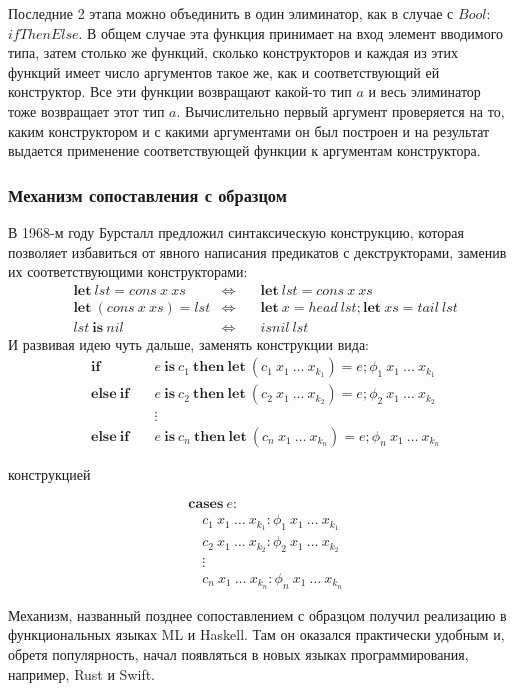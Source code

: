 Последние 2 этапа можно объединить в один элиминатор, как в случае с \(Bool\):
\(ifThenElse\). В общем случае эта функция принимает на вход элемент вводимого
типа, затем столько же функций, сколько конструкторов и каждая из этих функций
имеет число аргументов такое же, как и соответствующий ей конструктор. Все эти
функции возвращают какой-то тип \(a\) и весь элиминатор тоже возвращает этот тип \(a\).
Вычислительно первый аргумент проверяется на то, каким конструктором и с какими
аргументами он был построен и на результат выдается применение соответствующей
функции к аргументам конструктора.

\subsubsection{Механизм сопоставления с образцом}

В 1968-м году Бурсталл \cite{proving-properties-of-programs-by-structural-induction}
предложил синтаксическую конструкцию, которая позволяет избавиться от явного написания
предикатов с декструкторами, заменив их соответствующими конструкторами:
\begin{align*}
&\mathbf{let}\ lst = cons\ x\ xs &\Leftrightarrow &\quad\mathbf{let}\ lst = cons\ x\ xs\\
&\mathbf{let}\ (cons\ x\ xs) = lst &\Leftrightarrow
   &\quad\mathbf{let}\ x = head\ lst; \mathbf{let}\ xs = tail\ lst\\
&lst\ \mathbf{is}\ nil &\Leftrightarrow &\quad isnil\ lst
\end{align*}
И развивая идею чуть дальше, заменять конструкции вида:
\begin{align*}
&\mathbf{if}\ &&e\ \mathbf{is}\ c_1\ \mathbf{then\ let}\ (c_1\ x_1\ \dots\ x_{k_1}) = e;
   \phi_1\ x_1\ \dots\ x_{k_1}\\
&\mathbf{else\ if}\ &&e\ \mathbf{is}\ c_2\ \mathbf{then\ let}\ (c_2\ x_1\ \dots\ x_{k_2}) = e;
   \phi_2\ x_1\ \dots\ x_{k_2}\\
&&&\vdots\\
&\mathbf{else\ if}\ &&e\ \mathbf{is}\ c_n\ \mathbf{then\ let}\ (c_n\ x_1\ \dots\ x_{k_n}) = e;
   \phi_n\ x_1\ \dots\ x_{k_n}
\end{align*}

конструкцией

\begin{align*}
&\mathbf{cases}\ e:\\
&\quad c_1\ x_1\ \dots\ x_{k_1}: \phi_1\ x_1\ \dots\ x_{k_1}\\
&\quad c_2\ x_1\ \dots\ x_{k_2}: \phi_2\ x_1\ \dots\ x_{k_2}\\
&\quad\vdots\\
&\quad c_n\ x_1\ \dots\ x_{k_n}: \phi_n\ x_1\ \dots\ x_{k_n}
\end{align*}

Механизм, названный позднее сопоставлением с образцом получил реализацию в
функциональных языках ML и Haskell. Там он оказался практически
удобным и, обретя популярность, начал появляться в новых языках программирования,
например, Rust и Swift.
